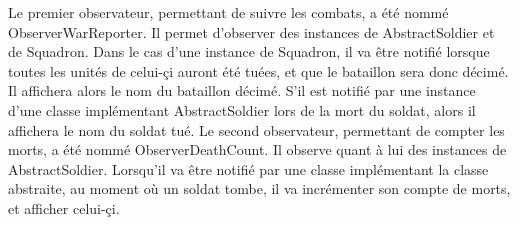 ﻿\documentclass[12pt]{article}
\begin{document}
Le premier observateur, permettant de suivre les combats, a été nommé ObserverWarReporter. Il permet d'observer des instances de AbstractSoldier et de Squadron.
Dans le cas d'une instance de Squadron, il va être notifié lorsque toutes les unités de celui-çi auront été tuées, et que le bataillon sera donc décimé. Il affichera alors le nom du bataillon décimé. S'il est notifié par une instance d'une classe implémentant AbstractSoldier lors de la mort du soldat, alors il affichera le nom du soldat tué.
Le second observateur, permettant de compter les morts, a été nommé ObserverDeathCount. Il observe quant à lui des instances de AbstractSoldier. Lorsqu'il va être notifié par une classe implémentant la classe abstraite, au moment où un soldat tombe, il va incrémenter son compte de morts, et afficher celui-çi.
\end{document}
